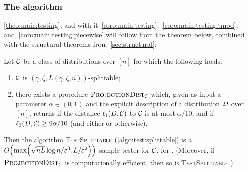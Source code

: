 \subsubsection{The algorithm}\label{ssec:main:algorithm}

\cref{theo:main:testing}, and with it~\cref{coro:main:testing},~\cref{coro:main:testing:tmod}, and~\cref{coro:main:testing:piecewise} will follow from the theorem below, combined with the structural theorems from~\cref{sec:structural}:
\begin{theorem}\label{theo:main:testing:detailed}
  Let $\class$ be a class of distributions over $[n]$ for which the following holds. 
    \begin{enumerate}
      \item $\class$ is $(\gamma, \zeta,L(\gamma,\zeta,n))$-splittable;
      \item there exists a procedure $\estimdist$ which, given as input a parameter $\alpha\in(0,1)$ and the explicit description of a distribution $\D$ over $[n]$, 
      returns \yes if the distance $\lp[1](\D,\class)$ to $\class$ is at most $\alpha/10$, and \no if $\lp[1](\D,\class) \geq 9\alpha/10$ (and either \yes or \no otherwise).
    \end{enumerate}
  Then the algorithm \textsc{TestSplittable} (\cref{algo:test:splittable}) is a $\bigO{ \max\mleft({\sqrt{nL}}\log n/{\eps^3}, L/{\eps^2}\mright) }$-sample tester for $\class$, for . 
  (Moreover, if $\estimdist$ is computationally efficient, then so is \textsc{TestSplittable}.)
\end{theorem}

